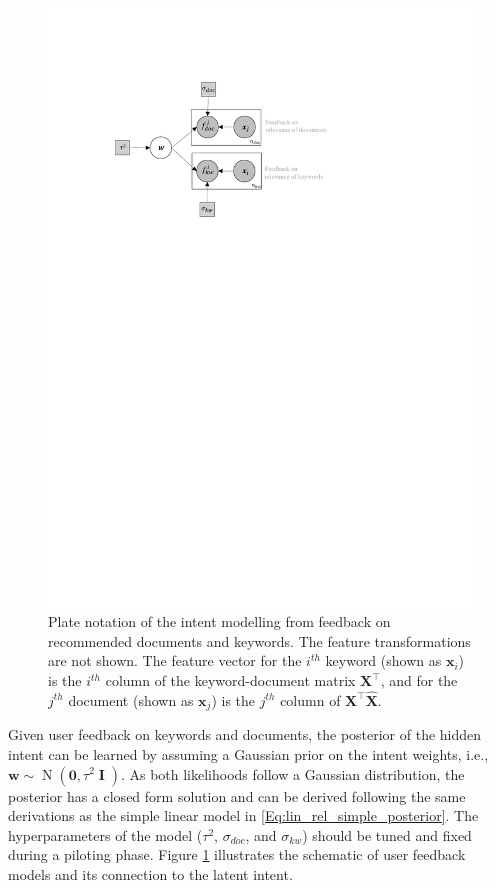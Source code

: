 \documentclass[dissertation,math,vertlayout,pdfa,colorlinks]{aaltoseries}
\newcommand{\bw}{\bm{w}}
\DeclareMathOperator{\eye}{\textbf{I}}
\DeclareMathOperator{\normalpdf}{N}
\newcommand{\tp}{^{\top}}
\begin{document}
\begin{figure}
	\centering
	\includegraphics[width=0.80\linewidth]{Figures/Plate_diagram_intent_kd.pdf}
	\caption{Plate notation of the intent modelling from feedback on recommended documents and keywords. The feature transformations are not shown. The feature vector for the $i^{th}$ keyword (shown as $\bm{x}_i$) is the $i^{th}$ column of the keyword-document matrix $\bm{X}\tp$, and for the $j^{th}$ document (shown as $\bm{x}_j$) is the $j^{th}$ column of $\bm{X}\tp\hat{\bm{X}}$.}
	\label{fig:Plate_intent_kd}
\end{figure}

Given user feedback on keywords and documents, the posterior of the hidden intent can be learned by assuming a Gaussian prior on the intent weights, i.e., $\bw \sim \normalpdf(\bm{0},\tau^2 \eye)$. As both likelihoods follow a Gaussian distribution, the posterior has a closed form solution and can be derived following the same derivations as the simple linear model in \ref{Eq:lin_rel_simple_posterior}. The hyperparameters of the model ($\tau^2$, $\sigma_{doc}$, and $\sigma_{kw}$) should be tuned and fixed during a piloting phase. Figure \ref{fig:Plate_intent_kd} illustrates the schematic of user feedback models and its connection to the latent intent. 
\end{document}
